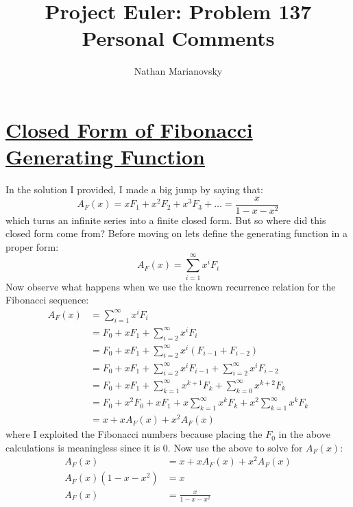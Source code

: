 \documentclass[12pt, letterpaper, onecolumn, conference, final]{IEEEtran}
\title{Project Euler: Problem 137 Personal Comments}
\author{Nathan Marianovsky}
\theoremstyle{definition}
\theoremstyle{plain}
\begin{document}
\maketitle

\section*{\underline{\Large{Closed Form of Fibonacci Generating Function}}}
\vspace{.3cm}
\noindent
In the solution I provided, I made a big jump by saying that:
\begin{equation*}
A_F(x) = xF_1 + x^2F_2 + x^3F_3 + \dots = \frac{x}{1 - x - x^2}
\end{equation*}
which turns an infinite series into a finite closed form. But so where did this closed form come from? Before moving on lets define the generating function in a proper form:
\begin{equation*}
A_F(x) = \sum_{i=1}^\infty x^iF_i
\end{equation*}
Now observe what happens when we use the known recurrence relation for the Fibonacci sequence:
\begin{equation*}
\begin{split}
A_F(x) &= \sum_{i=1}^\infty x^iF_i \\
&= F_0 + xF_1 + \sum_{i=2}^\infty x^iF_i \\
&= F_0 + xF_1 + \sum_{i=2}^\infty x^i(F_{i-1} + F_{i-2}) \\
&= F_0 + xF_1 + \sum_{i=2}^\infty x^iF_{i-1} + \sum_{i=2}^\infty x^iF_{i-2} \\
&= F_0 + xF_1 + \sum_{k=1}^\infty x^{k+1}F_k + \sum_{k=0}^\infty x^{k+2}F_k \\
&= F_0 + x^2F_0 + xF_1 + x\sum_{k=1}^\infty x^kF_k + x^2\sum_{k=1}^\infty x^kF_k \\
&= x + xA_F(x) + x^2A_F(x)
\end{split}
\end{equation*}
where I exploited the Fibonacci numbers because placing the $F_0$ in the above calculations is meaningless since it is 0. Now use the above to solve for $A_F(x)$:
\begin{equation*}
\begin{split}
A_F(x) &= x + xA_F(x) + x^2A_F(x)  \\
A_F(x) (1 - x - x^2) &= x \\
A_F(x) &= \frac{x}{1 - x - x^2}
\end{split}
\end{equation*}
\end{document}
